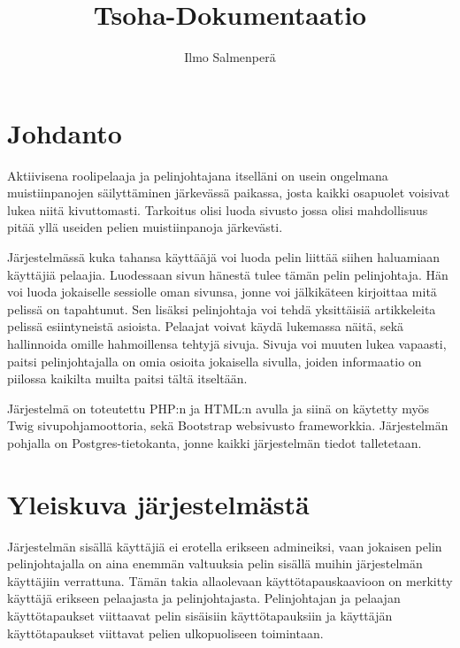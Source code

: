 \documentclass[11pt]{article}
\title{Tsoha-Dokumentaatio}
\author{Ilmo Salmenperä}
\begin{document}
\maketitle
\newpage
\section{Johdanto}
Aktiivisena roolipelaaja ja pelinjohtajana itselläni on usein ongelmana muistiinpanojen säilyttäminen järkevässä paikassa, josta kaikki osapuolet voisivat lukea niitä kivuttomasti. Tarkoitus olisi luoda sivusto jossa olisi mahdollisuus pitää yllä useiden pelien muistiinpanoja järkevästi. 

Järjestelmässä kuka tahansa käyttääjä voi luoda pelin liittää siihen haluamiaan käyttäjiä pelaajia. Luodessaan sivun hänestä tulee tämän pelin pelinjohtaja. Hän voi luoda jokaiselle sessiolle oman sivunsa, jonne voi jälkikäteen kirjoittaa mitä pelissä on tapahtunut. Sen lisäksi pelinjohtaja voi tehdä yksittäisiä artikkeleita pelissä esiintyneistä asioista. Pelaajat voivat käydä lukemassa näitä, sekä hallinnoida omille hahmoillensa tehtyjä sivuja. Sivuja voi muuten lukea vapaasti, paitsi pelinjohtajalla on omia osioita jokaisella sivulla, joiden informaatio on piilossa kaikilta muilta paitsi tältä itseltään.

Järjestelmä on toteutettu PHP:n ja HTML:n avulla ja siinä on käytetty myös Twig sivupohjamoottoria, sekä Bootstrap websivusto frameworkkia. Järjestelmän pohjalla on Postgres-tietokanta, jonne kaikki järjestelmän tiedot talletetaan.

\section{Yleiskuva järjestelmästä}
Järjestelmän sisällä käyttäjiä ei erotella erikseen admineiksi, vaan jokaisen pelin pelinjohtajalla on aina enemmän valtuuksia pelin sisällä muihin järjestelmän käyttäjiin verrattuna. Tämän takia allaolevaan käyttötapauskaavioon on merkitty käyttäjä erikseen pelaajasta ja pelinjohtajasta. Pelinjohtajan ja pelaajan käyttötapaukset viittaavat pelin sisäisiin käyttötapauksiin ja käyttäjän käyttötapaukset viittavat pelien ulkopuoliseen toimintaan.
\end{document}
